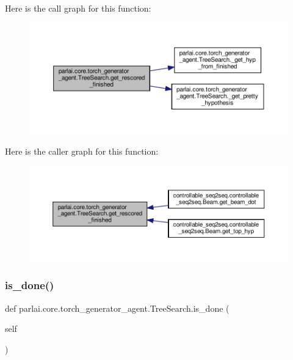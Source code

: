 Here is the call graph for this function\+:
\nopagebreak
\begin{figure}[H]
\begin{center}
\leavevmode
\includegraphics[width=350pt]{classparlai_1_1core_1_1torch__generator__agent_1_1TreeSearch_a4b70f85eec7d81b3a0e1afaea5b09332_cgraph}
\end{center}
\end{figure}
Here is the caller graph for this function\+:
\nopagebreak
\begin{figure}[H]
\begin{center}
\leavevmode
\includegraphics[width=350pt]{classparlai_1_1core_1_1torch__generator__agent_1_1TreeSearch_a4b70f85eec7d81b3a0e1afaea5b09332_icgraph}
\end{center}
\end{figure}
\mbox{\label{classparlai_1_1core_1_1torch__generator__agent_1_1TreeSearch_a35a3cbfe2df2d02bb46f7e492657afa5}} 
\subsubsection{\texorpdfstring{is\+\_\+done()}{is\_done()}}
{\footnotesize\ttfamily def parlai.\+core.\+torch\+\_\+generator\+\_\+agent.\+Tree\+Search.\+is\+\_\+done (\begin{DoxyParamCaption}\item[{}]{self }\end{DoxyParamCaption})}

